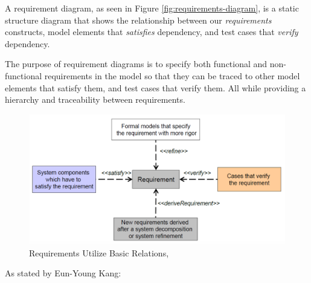 A requirement diagram, as seen in Figure \ref{fig:requirements-diagram}, is a static structure diagram that shows the relationship between our \textit{requirements} constructs, model elements that \textit{satisfies} dependency, and test cases that \textit{verify} dependency.

The purpose of requirement diagrams is to specify both functional and non-functional requirements in the model so that they can be traced to other model elements that satisfy them, and test cases that verify them. All while providing a hierarchy and traceability between requirements.

\begin{figure}[H]
    \centering
    \caption{Requirements Utilize Basic Relations, \cite{WormKangLec72024}}
    \label{fig:requirement-diagram-relations}
    \includegraphics[width=0.9\linewidth]{report/GroupTemplate/images/Requirements basic relations.png}
\end{figure}
As stated by Eun-Young Kang:
